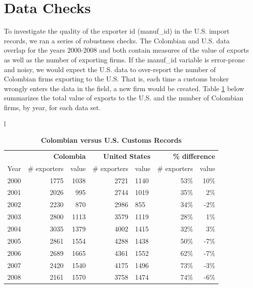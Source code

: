\section{Data Checks}
\label{sec:data_check}

To investigate the quality of the exporter id (manuf\_id) in the U.S. import
records, we ran a series of robustness checks. The Colombian and U.S. data
overlap for the years 2000-2008 and both contain measures of the value of
exports as well as the number of exporting firms. If the manuf\_id variable
is error-prone and noisy, we would expect the U.S. data to over-report the
number of Colombian firms exporting to the U.S. That is, each time a customs
broker wrongly enters the data in the field, a new firm would be created.
Table \ref{tab:ap_dat_comp} below summarizes the total value of exports to the U.S. and the
number of Colombian firms, by year, for each data set.

\begin{table}[!ht]
    \centering
{\small 
\begin{tabular}{l}
\begin{tabular}{rrrrlrr} \hline \hline 

& \multicolumn{2}{r}{\textbf{Colombia}} & \multicolumn{2}{r}{\textbf{United
States}} & \multicolumn{2}{r}{\textbf{\% difference}} \\ \cline{2-7}
Year & \# exporters & value & \# exporters & value & \# exporters & value \\ 
\hline
2000 & 1775 & 1038 & 2721 & 1140 & 53\% & 10\% \\ 
2001 & 2026 & 995 & 2744 & 1019 & 35\% & 2\% \\ 
2002 & 2230 & 870 & 2986 & 855 & 34\% & -2\% \\ 
2003 & 2800 & 1113 & 3579 & 1119 & 28\% & 1\% \\ 
2004 & 3035 & 1379 & 4002 & 1415 & 32\% & 3\% \\ 
2005 & 2861 & 1554 & 4288 & 1438 & 50\% & -7\% \\ 
2006 & 2689 & 1665 & 4361 & 1552 & 62\% & -7\% \\ 
2007 & 2420 & 1540 & 4175 & 1496 & 73\% & -3\% \\ 
2008 & 2161 & 1570 & 3758 & 1474 & 74\% & -6\% \\ \hline
\end{tabular}%
\end{tabular}%
}
\caption{\textbf{Colombian versus U.S. Customs Records}}
\label{tab:ap_dat_comp}
\end{table}

